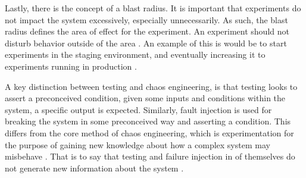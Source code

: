 \documentclass{article}
\begin{document}
Lastly, there is the concept of a blast radius. It is important that experiments do not impact the system excessively, especially unnecessarily. As such, the blast radius defines the area of effect for the experiment. An experiment should not disturb behavior outside of the area \cite{chaosJVM}\cite{OreillyChaos}. An example of this is would be to start experiments in the staging environment, and eventually increasing it to  experiments running in production \cite{GremlinPaper}.

A key distinction between testing and chaos engineering, is that testing looks to assert a preconceived condition, given some inputs and conditions within the system, a specific output is expected. Similarly, fault injection is used for breaking the system in some preconceived way and asserting a condition. This differs from the core method of chaos engineering, which is experimentation for the purpose of gaining new knowledge about how a complex system may misbehave \cite{OreillyChaos}. That is to say that testing and failure injection in of themselves do not generate new information about the system \cite{OreillyChaos}. 
\end{document}
